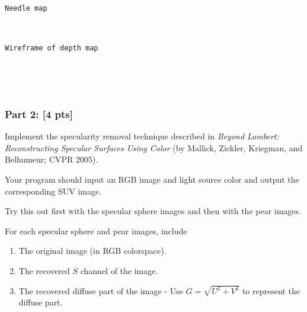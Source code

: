 \documentclass[11pt]{article}
\begin{document}
    \begin{Verbatim}[commandchars=\\\{\}]
Needle map

    \end{Verbatim}

    \begin{center}
    \end{center}
    { \hspace*{\fill} \\}
    
    \begin{Verbatim}[commandchars=\\\{\}]
Wireframe of depth map

    \end{Verbatim}

    \begin{center}
    \end{center}
    { \hspace*{\fill} \\}
    
    \begin{center}
    \end{center}
    { \hspace*{\fill} \\}
    
    \subsubsection{Part 2: {[}4 pts{]}}\label{part-2-4-pts}

Implement the specularity removal technique described in \emph{Beyond
Lambert: Reconstructing Specular Surfaces Using Color} (by Mallick,
Zickler, Kriegman, and Belhumeur; CVPR 2005).

Your program should input an RGB image and light source color and output
the corresponding SUV image.

Try this out first with the specular sphere images and then with the
pear images.

For each specular sphere and pear images, include

\begin{enumerate}
\def\labelenumi{\arabic{enumi}.}
\item
  The original image (in RGB colorspace).
\item
  The recovered \(S\) channel of the image.
\item
  The recovered diffuse part of the image - Use \(G = \sqrt{U^2+V^2}\)
  to represent the diffuse part.
\end{enumerate}
\end{document}
